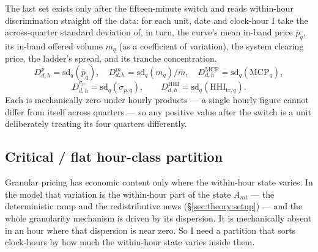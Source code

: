 \documentclass[11pt,a4paper]{article}
\theoremstyle{definition}
\theoremstyle{remark}
\theoremstyle{plain}
\begin{document}
The last set exists only after the fifteen-minute switch and reads within-hour discrimination straight off the data: for each unit, date and clock-hour I take the across-quarter standard deviation of, in turn, the curve's mean in-band price $\bar p_q$, its in-band offered volume $m_q$ (as a coefficient of variation), the system clearing price, the ladder's spread, and its tranche concentration,
\[
D^{\bar p}_{d,h} = \mathrm{sd}_q(\bar p_q), \quad
D^{m}_{d,h} = \mathrm{sd}_q(m_q)/\bar m, \quad
D^{\text{MCP}}_{d,h} = \mathrm{sd}_q(\text{MCP}_q),
\]
\[
D^{\sigma_p}_{d,h} = \mathrm{sd}_q(\sigma_{p,q}), \qquad
D^{\text{HHI}}_{d,h} = \mathrm{sd}_q(\text{HHI}_{\text{tr},q}).
\]
Each is mechanically zero under hourly products --- a single hourly figure cannot differ from itself across quarters --- so any positive value after the switch is a unit deliberately treating its four quarters differently.
\subsection{Critical / flat hour-class partition}\label{sec:data:partition}

Granular pricing has economic content only where the within-hour state varies. In the model that variation is the within-hour part of the state $A_{mt}$ --- the deterministic ramp and the redistributive news (\S\ref{sec:theory:setup}) --- and the whole granularity mechanism is driven by its dispersion. It is mechanically absent in an hour where that dispersion is near zero. So I need a partition that sorts clock-hours by how much the within-hour state varies inside them.
\end{document}
